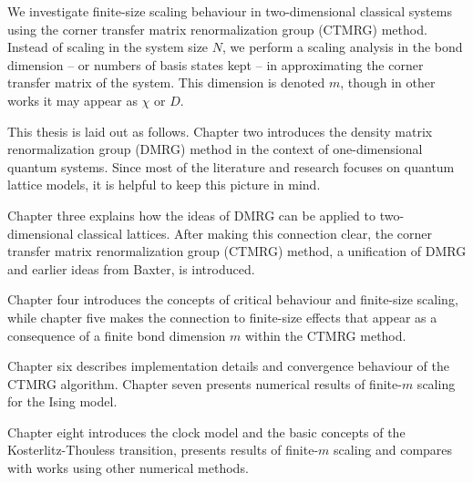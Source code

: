 We investigate finite-size scaling behaviour in two-dimensional classical systems using
the corner transfer matrix renormalization group (CTMRG) method. Instead of scaling in the
system size $N$, we perform a scaling analysis in the bond dimension -- or numbers of
basis states kept -- in approximating the corner transfer matrix of the system. This
dimension is denoted $m$, though in other works it may appear as $\chi$ or $D$.

This thesis is laid out as follows. Chapter two introduces the density matrix
renormalization group (DMRG) method in the context of one-dimensional quantum systems.
Since most of the literature and research focuses on quantum lattice models, it is helpful
to keep this picture in mind.

Chapter three explains how the ideas of DMRG can be applied to two-dimensional classical
lattices. After making this connection clear, the corner transfer matrix
renormalization group (CTMRG) method, a unification of DMRG and earlier ideas from Baxter, is introduced.

Chapter four introduces the concepts of critical behaviour and finite-size scaling,
while chapter five makes the connection to finite-size effects that appear as a consequence of a finite bond dimension
$m$ within the CTMRG method.

Chapter six describes implementation details and convergence behaviour of the CTMRG algorithm.
Chapter seven presents numerical results of finite-$m$ scaling for the Ising model.

Chapter eight introduces the clock model and the basic concepts of the Kosterlitz-Thouless transition,
presents results of finite-$m$ scaling and compares with works using other numerical methods.
